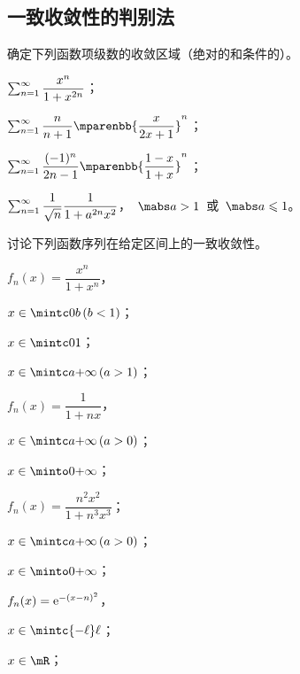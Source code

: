 \subsection{一致收敛性的判别法}
\begin{exercise}
\item 确定下列函数项级数的收敛区域（绝对的和条件的）。
\begin{exlistcols}
  \item $\sum_{n=1}^\infty\dfrac{x^n}{1+x^{2n}}$；
  \item $\sum_{n=1}^\sinf\dfrac n{n+1}\mparenbb{\dfrac x{2x+1}}^n$；
  \item $\sum_{n=1}^\sinf\dfrac{(-1)^n}{2n-1}\mparenbb{\dfrac{1-x}{1+x}}^n$；
  \item $\sum_{n=1}^\infty\dfrac1{\sqrt n}\dfrac1{1+a^{2n}x^2}$，~$\mabs a>1$~或~$\mabs a\leq 1$。
\end{exlistcols}
\item 讨论下列函数序列在给定区间上的一致收敛性。
\begin{exlist}
  \item $f_n(x)=\dfrac{x^n}{1+x^n}$，
  \begin{exlistcols}[label=\Ding*,3]
    \item $x\in\mintc0b\mcond{b<1}$；
    \item $x\in\mintc01$；
    \item $x\in\mintc a\pinf\mcond{a>1}$；
  \end{exlistcols}
  \item $f_n(x)=\dfrac1{1+nx}$，
  \begin{exlistcols}[label=\Ding*,3]
    \item $x\in\mintc a\pinf\mcond{a>0}$；
    \item $x\in\minto0\pinf$；
  \end{exlistcols}
  \item $f_n(x)=\dfrac{n^2x^2}{1+n^3x^3}$；
  \begin{exlistcols}[label=\Ding*,3]
    \item $x\in\mintc a\pinf\mcond{a>0}$；
    \item $x\in\minto0\pinf$；
  \end{exlistcols}
  \item $f_n(x)=\mathrm e^{-(x-n)^2}$，
  \begin{exlistcols}[label=\Ding*,3]
    \item $x\in\mintc{-\ell}\ell$；
    \item $x\in\mR$；
  \end{exlistcols}
\begin{exlistcols*}

\end{exlistcols*}
\end{exlist}
\end{exercise}
